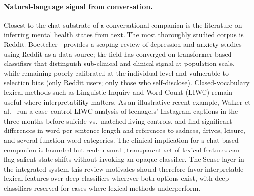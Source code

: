 \documentclass[11pt,a4paper]{article}
\begin{document}
\paragraph{Natural-language signal from conversation.}
Closest to the chat substrate of a conversational companion is the
literature on inferring mental health states from text. The most
thoroughly studied corpus is Reddit.
Boettcher~\cite{Boettcher2021RedditMHReview} provides a scoping
review of depression and anxiety studies using Reddit as a data
source; the field has converged on transformer-based classifiers
that distinguish sub-clinical and clinical signal at population
scale, while remaining poorly calibrated at the individual level
and vulnerable to selection bias (only Reddit users; only those who
self-disclose). Closed-vocabulary lexical methods such as Linguistic
Inquiry and Word Count (LIWC) remain useful where interpretability
matters. As an illustrative recent example, Walker et
al.~\cite{Walker2024InstagramSuicideLIWC} run a case--control LIWC
analysis of teenagers' Instagram captions in the three months
before suicide vs.\ matched living controls, and find significant
differences in word-per-sentence length and references to sadness,
drives, leisure, and several function-word categories. The clinical
implication for a chat-based companion is bounded but real: a small,
transparent set of lexical features can flag salient state shifts
without invoking an opaque classifier. The Sense layer in the
integrated system this review motivates should therefore favor
interpretable lexical features over deep classifiers wherever both
options exist, with deep classifiers reserved for cases where
lexical methods underperform.
\end{document}
